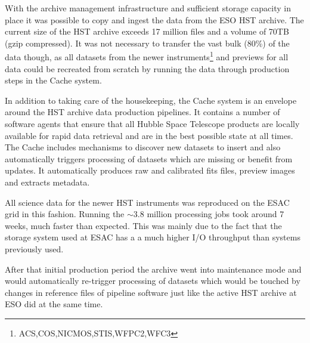 With the archive management infrastructure and sufficient storage capacity in place it was possible to copy and ingest the data from the ESO HST archive. The current size of the HST archive exceeds 17 million files and a volume of 70TB (gzip compressed). It was not necessary to transfer the vast bulk (80\%) of the data though, as all datasets from the newer instruments\footnote{ACS,COS,NICMOS,STIS,WFPC2,WFC3} and previews for all data could be recreated from scratch by running the data through production steps in the Cache system. 

In addition to taking care of the housekeeping, the Cache system is an envelope around the HST archive data production pipelines. It contains a number of software agents that ensure that all Hubble Space Telescope products are locally available for rapid data retrieval and are in the best possible state at all times.  The Cache includes mechanisms to discover new datasets to insert and also automatically triggers processing of datasets which are missing or benefit from updates. It automatically produces raw and calibrated fits files, preview images and extracts metadata.

All science data for the newer HST instruments was reproduced on the ESAC grid in this fashion. Running the $\sim$3.8 million processing jobs took around 7 weeks, much faster than expected. This was mainly due to the fact that the storage system used at ESAC has a a much higher I/O throughput than systems previously used.

After that initial production period the archive went into maintenance mode and would automatically re-trigger processing of datasets which would be touched by changes in reference files of pipeline software just like the active HST archive at ESO did at the same time.

